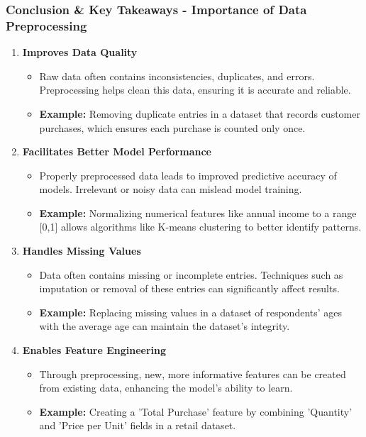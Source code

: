 \documentclass[aspectratio=169]{beamer}
\begin{document}
\begin{frame}[fragile]
    \frametitle{Conclusion \& Key Takeaways - Importance of Data Preprocessing}
    \begin{enumerate}
        \item \textbf{Improves Data Quality}
            \begin{itemize}
                \item Raw data often contains inconsistencies, duplicates, and errors. Preprocessing helps clean this data, ensuring it is accurate and reliable.
                \item \textbf{Example:} Removing duplicate entries in a dataset that records customer purchases, which ensures each purchase is counted only once.
            \end{itemize}
        \item \textbf{Facilitates Better Model Performance}
            \begin{itemize}
                \item Properly preprocessed data leads to improved predictive accuracy of models. Irrelevant or noisy data can mislead model training.
                \item \textbf{Example:} Normalizing numerical features like annual income to a range [0,1] allows algorithms like K-means clustering to better identify patterns.
            \end{itemize}
        \item \textbf{Handles Missing Values}
            \begin{itemize}
                \item Data often contains missing or incomplete entries. Techniques such as imputation or removal of these entries can significantly affect results.
                \item \textbf{Example:} Replacing missing values in a dataset of respondents' ages with the average age can maintain the dataset's integrity.
            \end{itemize}
        \item \textbf{Enables Feature Engineering}
            \begin{itemize}
                \item Through preprocessing, new, more informative features can be created from existing data, enhancing the model's ability to learn.
                \item \textbf{Example:} Creating a 'Total Purchase' feature by combining 'Quantity' and 'Price per Unit' fields in a retail dataset.
            \end{itemize}
    \end{enumerate}
\end{frame}
\end{document}

